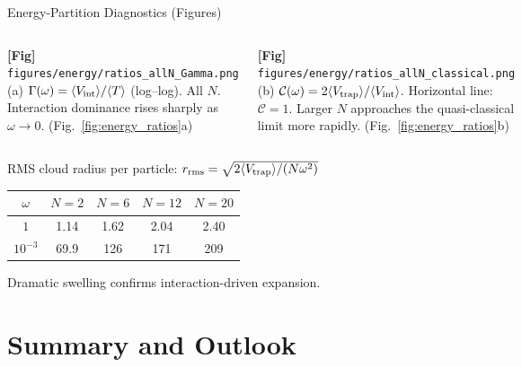 \documentclass[aspectratio=169,10pt]{beamer}
\newcommand{\figphc}[2]{%
  \colorbox{gray!10}{\parbox{0.44\linewidth}{%
    \centering\smallskip
    \textbf{\color{gray!70}[Fig]}\\[2pt]%
    {\tiny\color{gray!60}\nolinkurl{#1}}\\[2pt]%
    {\scriptsize\color{gray!60}#2}\smallskip}}}
\begin{document}
\begin{frame}{Energy-Partition Diagnostics (Figures)}
  \begin{columns}[T]
      \centering
      \figphc{figures/energy/ratios_allN_Gamma.png}{%
        (a) $\Gamma(\omega)=\langle V_{\rm int}\rangle/\langle T\rangle$
        (log--log). All $N$. Interaction dominance rises sharply as
        $\omega\to 0$. (Fig.~\ref{fig:energy_ratios}a)}
      \centering
      \figphc{figures/energy/ratios_allN_classical.png}{%
        (b) $\mathcal{C}(\omega)=2\langle V_{\rm trap}\rangle/
        \langle V_{\rm int}\rangle$. Horizontal line: $\mathcal{C}=1$.
        Larger $N$ approaches the quasi-classical limit more rapidly.
        (Fig.~\ref{fig:energy_ratios}b)}
  \end{columns}

  \vspace{0.3cm}
  RMS cloud radius per particle:
  $r_{\rm rms}=\sqrt{2\langle V_{\rm trap}\rangle/(N\omega^2)}$

  \begin{center}
    \begin{tabular}{c|cccc}
      \toprule
      $\omega$ & $N=2$ & $N=6$ & $N=12$ & $N=20$ \\
      \midrule
      $1$         &  1.14 &  1.62 &  2.04 &  2.40 \\
      $10^{-3}$   & 69.9  & 126   & 171   & 209   \\
      \bottomrule
    \end{tabular}
  \end{center}
  \small Dramatic swelling confirms interaction-driven expansion.
\end{frame}


\section{Summary and Outlook}
\end{document}
